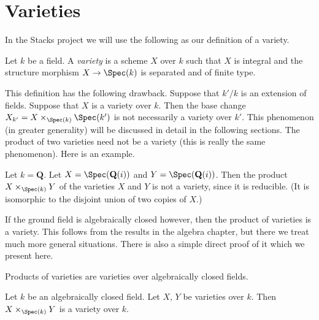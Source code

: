 \section{Varieties}
\label{section-varieties}

\noindent
In the Stacks project we will use the following as our definition
of a variety.

\begin{definition}
\label{definition-variety}
Let $k$ be a field. A {\it variety} is a scheme $X$ over $k$
such that $X$ is integral and the structure morphism
$X \to \Spec(k)$ is separated and of finite type.
\end{definition}

\noindent
This definition has the following drawback. Suppose that
$k'/k$ is an extension of fields. Suppose that $X$
is a variety over $k$. Then the base change
$X_{k'} = X \times_{\Spec(k)} \Spec(k')$ is
not necessarily a variety over $k'$. This phenomenon (in greater
generality) will be discussed in detail in the following sections.
The product of two varieties need not be a variety
(this is really the same phenomenon). Here is an example.

\begin{example}
\label{example-product-not-a-variety}
Let $k = \mathbf{Q}$. Let $X = \Spec(\mathbf{Q}(i))$
and $Y = \Spec(\mathbf{Q}(i))$. Then the product
$X \times_{\Spec(k)} Y$ of the varieties $X$ and $Y$
is not a variety, since it is reducible. (It is isomorphic
to the disjoint union of two copies of $X$.)
\end{example}

\noindent
If the ground field is algebraically closed however, then the
product of varieties is a variety. This follows from the results
in the algebra chapter, but there we treat much more general situations.
There is also a simple direct proof of it which we present here.

\begin{lemma}
\label{lemma-product-varieties}
\begin{slogan}
Products of varieties are varieties over algebraically closed fields.
\end{slogan}
Let $k$ be an algebraically closed field.
Let $X$, $Y$ be varieties over $k$.
Then $X \times_{\Spec(k)} Y$ is a variety over $k$.
\end{lemma}

